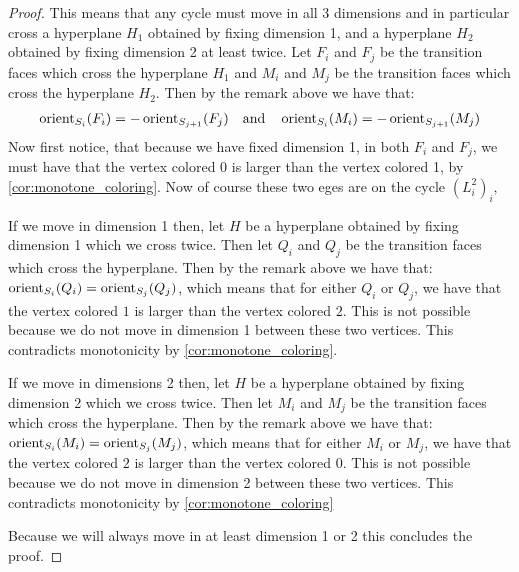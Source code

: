 \begin{proof}
	This means that any cycle must move in all 3 dimensions and in particular cross a hyperplane $H_1$ obtained by fixing dimension 1, and a hyperplane $H_2$ obtained by fixing dimension 2 at least twice. Let $F_i$ and $F_j$ be the transition faces which cross the hyperplane $H_1$ and $M_i$ and $M_j$ be the transition faces which cross the hyperplane $H_2$. Then by the remark above we have that:
	\begin{align*}
		\operatorname{orient}_{S_i}(F_i) = - \operatorname{orient}_{S_{j+1}}(F_j) \quad \text{and} \quad \operatorname{orient}_{S_i}(M_i) = - \operatorname{orient}_{S_{j+1}}(M_j)
	\end{align*}
	Now first notice, that because we have fixed dimension 1, in both $F_i$ and $F_j$, we must have that the vertex colored 0 is larger than the vertex colored 1, by \cref{cor:monotone_coloring}. Now of course these two eges are on the cycle $(L_i^2)_i$,

	\begin{case}{1}
		If we move in dimension 1 then, let $H$ be a hyperplane obtained by fixing dimension 1 which we cross twice. Then let $Q_i$ and $Q_j$ be the transition faces which cross the hyperplane. Then by the remark above we have that: $\operatorname{orient}_{S_i}(Q_i) = \operatorname{orient}_{S_j}(Q_j)$, which means that for either $Q_i$ or $Q_j$, we have that the vertex colored $1$ is larger than the vertex colored $2$. This is not possible because we do not move in dimension 1 between these two vertices. This contradicts monotonicity by \cref{cor:monotone_coloring}.
	\end{case}
	\begin{case}{2}
		If we move in dimensions 2 then, let $H$ be a hyperplane obtained by fixing dimension 2 which we cross twice. Then let $M_i$ and $M_j$ be the transition faces which cross the hyperplane. Then by the remark above we have that: $\operatorname{orient}_{S_i}(M_i) = \operatorname{orient}_{S_j}(M_j)$, which means that for either $M_i$ or $M_j$, we have that the vertex colored $2$ is larger than the vertex colored $0$. This is not possible because we do not move in dimension 2 between these two vertices. This contradicts monotonicity by \cref{cor:monotone_coloring}
	\end{case}
	Because we will always move in at least dimension 1 or 2 this concludes the proof.
\end{proof}

